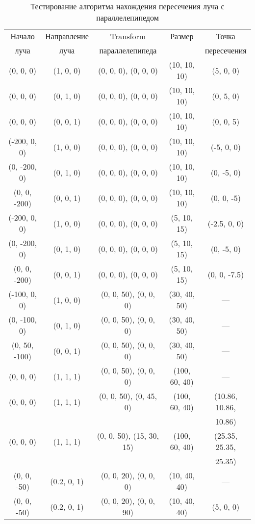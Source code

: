 \begin{table}[h]
	\begin{center}
		\begin{threeparttable}
			\captionsetup{justification=raggedright,singlelinecheck=off}
			\caption{Тестирование алгоритма нахождения пересечения луча с параллелепипедом}
			\label{tbl:test_box_hit}
			\begin{tabular}{|c|c|c|c|c|}
				\hline
				Начало  & Направление  & Transform  & Размер & Точка \\
				луча &  луча &  параллелепипеда  &   & пересечения \\
				\hline
				(0, 0, 0) & (1, 0, 0) & (0, 0, 0), (0, 0, 0) & (10, 10, 10) & (5, 0, 0) \\
				\hline
				(0, 0, 0) & (0, 1, 0) & (0, 0, 0), (0, 0, 0) & (10, 10, 10) & (0, 5, 0) \\
				\hline
				(0, 0, 0) & (0, 0, 1) & (0, 0, 0), (0, 0, 0) & (10, 10, 10) & (0, 0, 5) \\
				\hline
				(-200, 0, 0) & (1, 0, 0) & (0, 0, 0), (0, 0, 0) & (10, 10, 10) & (-5, 0, 0) \\
				\hline
				(0, -200, 0) & (0, 1, 0) & (0, 0, 0), (0, 0, 0) & (10, 10, 10) & (0, -5, 0) \\
				\hline
				(0, 0, -200) & (0, 0, 1) & (0, 0, 0), (0, 0, 0) & (10, 10, 10) & (0, 0, -5) \\
				\hline
				(-200, 0, 0) & (1, 0, 0) & (0, 0, 0), (0, 0, 0) & (5, 10, 15) & (-2.5, 0, 0) \\
				\hline
				(0, -200, 0) & (0, 1, 0) & (0, 0, 0), (0, 0, 0) & (5, 10, 15) & (0, -5, 0) \\
				\hline
				(0, 0, -200) & (0, 0, 1) & (0, 0, 0), (0, 0, 0) & (5, 10, 15) & (0, 0, -7.5) \\
				\hline
				(-100, 0, 0) & (1, 0, 0) & (0, 0, 50), (0, 0, 0) & (30, 40, 50) & --- \\
				\hline
				(0, -100, 0) & (0, 1, 0) & (0, 0, 50), (0, 0, 0) & (30, 40, 50) & --- \\
				\hline
				(0, 50, -100) & (0, 0, 1) & (0, 0, 50), (0, 0, 0) & (30, 40, 50) & --- \\
				\hline
				(0, 0, 0) & (1, 1, 1) & (0, 0, 50), (0, 0, 0) & (100, 60, 40) & --- \\
				\hline
				(0, 0, 0) & (1, 1, 1) & (0, 0, 50), (0, 45, 0) & (100, 60, 40) & (10.86, 10.86, \\
				 &  &  &  & 10.86) \\
				\hline
				(0, 0, 0) & (1, 1, 1) & (0, 0, 50), (15, 30, 15) & (100, 60, 40) & (25.35, 25.35, \\
				 &  &  &  &  25.35) \\
				\hline
				(0, 0, -50) & (0.2, 0, 1) & (0, 0, 20), (0, 0, 0) & (10, 40, 40) & --- \\
				\hline
				(0, 0, -50) & (0.2, 0, 1) & (0, 0, 20), (0, 0, 90) & (10, 40, 40) & (5, 0, 0) \\
				\hline
				
			\end{tabular}
		\end{threeparttable}
	\end{center}
\end{table}

